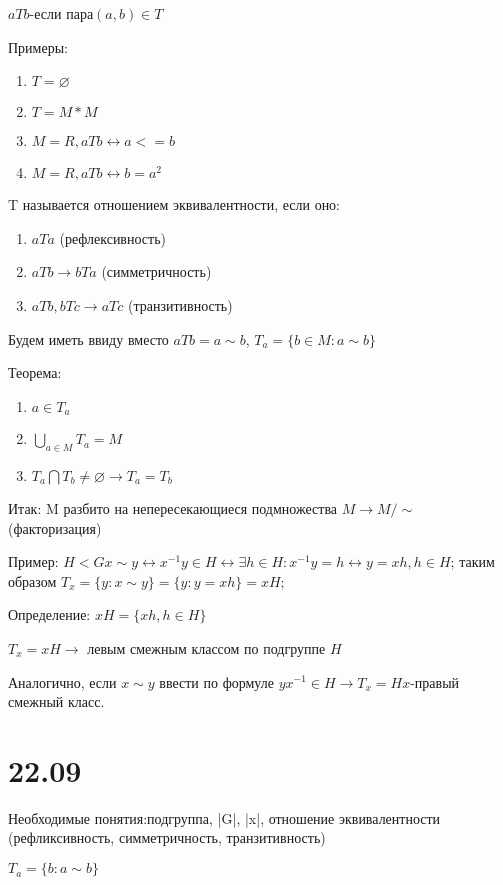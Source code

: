 \documentclass[12pt]{article}
\begin{document}
$aTb$-если пара$(a,b)\in T$ 

Примеры:
\begin{enumerate}
\item $T=\varnothing$
\item $T=M*M$
\item $M=R, aTb \leftrightarrow a<=b$
\item $M=R, aTb \leftrightarrow b=a^2$
\end{enumerate}

T называется отношением эквивалентности, если оно:
\begin{enumerate}
\item $aTa$ (рефлексивность)
\item $aTb \rightarrow bTa$ (симметричность)
\item $aTb, bTc \rightarrow aTc$ (транзитивность)
\end{enumerate}

Будем иметь ввиду вместо $aTb=a\sim b$, $T_a=\{b\in M:a\sim b\}$

Теорема:
\begin{enumerate}
\item $a\in T_a$
\item $\bigcup_{a\in M} T_a=M$
\item $T_a \bigcap T_b \not= \varnothing \rightarrow T_a=T_b$
\end{enumerate}


Итак: M разбито на непересекающиеся подмножества $M\rightarrow M/\sim$ (факторизация)

Пример: $H<G x\sim y \leftrightarrow x^{-1}y \in H \leftrightarrow \exists h\in H: x^{-1}y=h\leftrightarrow y=xh, h\in H$; таким образом $T_x=\{y:x\sim y\}=\{y:y=xh\}=xH;$

Определение: $xH=\{xh, h\in H\}$

$T_x=xH \rightarrow$ левым смежным классом по подгруппе $H$

Аналогично, если $ x\sim y$ ввести по формуле $yx^{-1}\in H\rightarrow T_x=Hx$-правый смежный класс.

\section{22.09}

Необходимые понятия:подгруппа, |G|, |x|, отношение эквивалентности (рефликсивность, симметричность, транзитивность)

$T_a=\{b:a\sim b\} $
\end{document}
